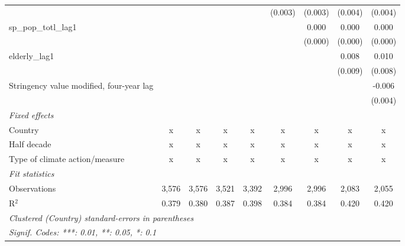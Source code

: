 \begin{tabular}{lcccccccc}
                                                                            &             &             &             &             & (0.003)     & (0.003)     & (0.004)      & (0.004)\\   
   sp\_pop\_totl\_lag1                                                      &             &             &             &             &             & 0.000       & 0.000        & 0.000\\   
                                                                            &             &             &             &             &             & (0.000)     & (0.000)      & (0.000)\\   
   elderly\_lag1                                                            &             &             &             &             &             &             & 0.008        & 0.010\\   
                                                                            &             &             &             &             &             &             & (0.009)      & (0.008)\\   
   Stringency value modified, four-year lag                                 &             &             &             &             &             &             &              & -0.006\\   
                                                                            &             &             &             &             &             &             &              & (0.004)\\   
   \emph{Fixed effects}\\
   Country                                                                  & x           & x           & x           & x           & x           & x           & x            & x\\  
   Half decade                                                              & x           & x           & x           & x           & x           & x           & x            & x\\  
   Type of climate action/measure                                           & x           & x           & x           & x           & x           & x           & x            & x\\  
   \midrule \emph{Fit statistics}\\
   Observations                                                             & 3,576       & 3,576       & 3,521       & 3,392       & 2,996       & 2,996       & 2,083        & 2,055\\  
   R$^2$                                                                    & 0.379       & 0.380       & 0.387       & 0.398       & 0.384       & 0.384       & 0.420        & 0.420\\  
   \midrule
   \multicolumn{9}{l}{\emph{Clustered (Country) standard-errors in parentheses}}\\
   \multicolumn{9}{l}{\emph{Signif. Codes: ***: 0.01, **: 0.05, *: 0.1}}\\
\end{tabular}
\par\endgroup


